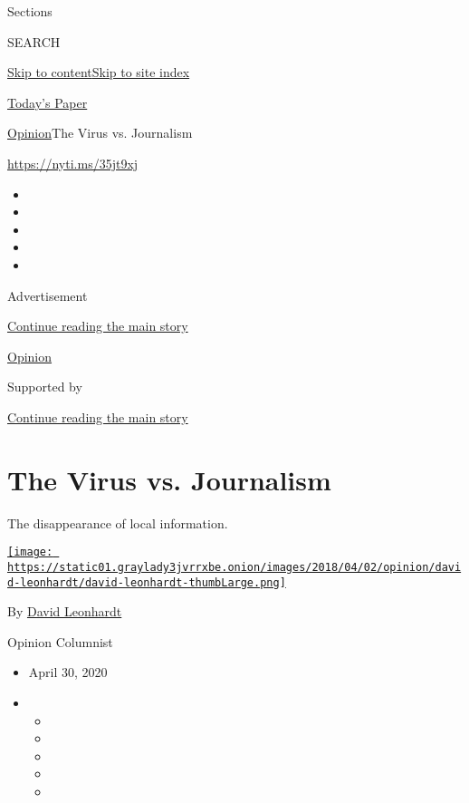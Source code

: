 Sections

SEARCH

\protect\hyperlink{site-content}{Skip to
content}\protect\hyperlink{site-index}{Skip to site index}

\href{https://myaccount.nytimes3xbfgragh.onion/auth/login?response_type=cookie\&client_id=vi}{}

\href{https://www.nytimes3xbfgragh.onion/section/todayspaper}{Today's
Paper}

\href{/section/opinion}{Opinion}\textbar{}The Virus vs. Journalism

\url{https://nyti.ms/35jt9xj}

\begin{itemize}
\item
\item
\item
\item
\item
\end{itemize}

Advertisement

\protect\hyperlink{after-top}{Continue reading the main story}

\href{/section/opinion}{Opinion}

Supported by

\protect\hyperlink{after-sponsor}{Continue reading the main story}

\hypertarget{the-virus-vs-journalism}{%
\section{The Virus vs. Journalism}\label{the-virus-vs-journalism}}

The disappearance of local information.

\href{https://www.nytimes3xbfgragh.onion/by/david-leonhardt}{\texttt{[image: https://static01.graylady3jvrrxbe.onion/images/2018/04/02/opinion/david-leonhardt/david-leonhardt-thumbLarge.png]}}

By \href{https://www.nytimes3xbfgragh.onion/by/david-leonhardt}{David
Leonhardt}

Opinion Columnist

\begin{itemize}
\item
  April 30, 2020
\item
  \begin{itemize}
  \item
  \item
  \item
  \item
  \item
  \end{itemize}
\end{itemize}

